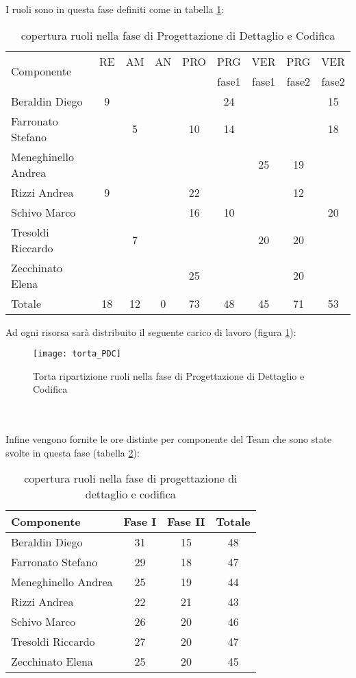 I ruoli sono in questa fase definiti come in tabella \ref{tab:ruolidc}:\\
\begin{table}[h!]
\centering
\begin{tabular}{|l|c|c|c|c|c|c|c|c|}
\hline
\multirow{2}{*}{Componente}& RE& AM& AN& PRO& PRG&VER& PRG& VER \\
					      &    &     &      &        & fase1&fase1&fase2&fase2\\
\hline
Beraldin Diego & 9& & & & 24& & & 15\\
Farronato Stefano & & 5& & 10&14 & & & 18\\
Meneghinello Andrea & & & & & & 25& 19& \\
Rizzi Andrea & 9& & & 22& & & 12& \\
Schivo Marco & & & & 16& 10& & & 20\\
Tresoldi Riccardo & & 7& & & & 20& 20& \\
Zecchinato Elena & & & & 25& & & 20& \\
\hline
Totale & 18& 12& 0& 73& 48& 45& 71& 53\\
\hline
\end{tabular}
\caption{copertura ruoli nella fase di Progettazione di Dettaglio e Codifica}\label{tab:ruolidc}
\end{table}
\clearpage
Ad ogni risorsa sarà distribuito il seguente carico di lavoro (figura \ref{fig:ruolidc}):\\
\begin{figure}[h!]
\centering
  \texttt{[image: torta\_PDC]}
\caption{Torta ripartizione ruoli nella fase di Progettazione di Dettaglio e Codifica}\label{fig:ruolidc}
\end{figure}
\\\\
Infine vengono fornite le ore distinte per componente del Team che sono state svolte in questa fase (tabella \ref{tab:ruolidc2}):\\
\begin{table}[h]
\centering
\begin{tabular}{|l|c|c|c|}
\hline
Componente& Fase I& Fase II& Totale\\
\hline
Beraldin Diego & 31& 15& 48\\
Farronato Stefano & 29& 18& 47\\
Meneghinello Andrea & 25& 19& 44\\
Rizzi Andrea &22 &21 & 43\\
Schivo Marco & 26& 20& 46\\
Tresoldi Riccardo & 27& 20& 47\\
Zecchinato Elena & 25& 20& 45\\
\hline
\end{tabular}
\caption{copertura ruoli nella fase di progettazione di dettaglio e codifica}\label{tab:ruolidc2}
\end{table}


